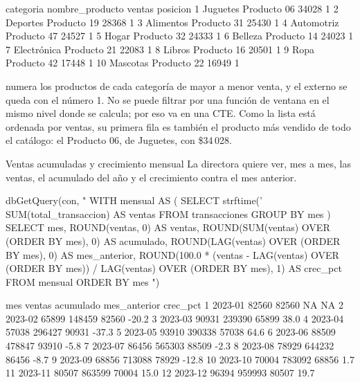 \begin{rsalida}
     categoria nombre_producto ventas posicion
1     Juguetes     Producto 06  34028        1
2     Deportes     Producto 19  28368        1
3    Alimentos     Producto 31  25430        1
4   Automotriz     Producto 47  24527        1
5        Hogar     Producto 32  24333        1
6      Belleza     Producto 14  24023        1
7  Electrónica     Producto 21  22083        1
8       Libros     Producto 16  20501        1
9         Ropa     Producto 42  17448        1
10    Mascotas     Producto 22  16949        1
\end{rsalida}

 numera los productos de cada categoría de mayor a
menor venta, y el  externo se queda con el número 1. No se
puede filtrar por una función de ventana en el mismo nivel donde se calcula;
por eso va en una CTE. Como la lista está ordenada por
ventas, su primera fila es también el producto más vendido de todo el
catálogo: el Producto 06, de Juguetes, con \$34\,028.

\begin{ejemplo}{Ventas acumuladas y crecimiento mensual}
La directora quiere ver, mes a mes, las ventas, el acumulado del año y el
crecimiento contra el mes anterior.
\end{ejemplo}

\begin{rcode}
dbGetQuery(con, "
  WITH mensual AS (
    SELECT strftime('%
           SUM(total_transaccion)   AS ventas
    FROM transacciones
    GROUP BY mes
  )
  SELECT mes,
         ROUND(ventas, 0)                           AS ventas,
         ROUND(SUM(ventas) OVER (ORDER BY mes), 0)  AS acumulado,
         ROUND(LAG(ventas) OVER (ORDER BY mes), 0)  AS mes_anterior,
         ROUND(100.0 * (ventas - LAG(ventas) OVER (ORDER BY mes)) /
               LAG(ventas) OVER (ORDER BY mes), 1)  AS crec_pct
  FROM mensual
  ORDER BY mes
")
\end{rcode}

\begin{rsalida}
       mes ventas acumulado mes_anterior crec_pct
1  2023-01  82560     82560           NA       NA
2  2023-02  65899    148459        82560    -20.2
3  2023-03  90931    239390        65899     38.0
4  2023-04  57038    296427        90931    -37.3
5  2023-05  93910    390338        57038     64.6
6  2023-06  88509    478847        93910     -5.8
7  2023-07  86456    565303        88509     -2.3
8  2023-08  78929    644232        86456     -8.7
9  2023-09  68856    713088        78929    -12.8
10 2023-10  70004    783092        68856      1.7
11 2023-11  80507    863599        70004     15.0
12 2023-12  96394    959993        80507     19.7
\end{rsalida}

